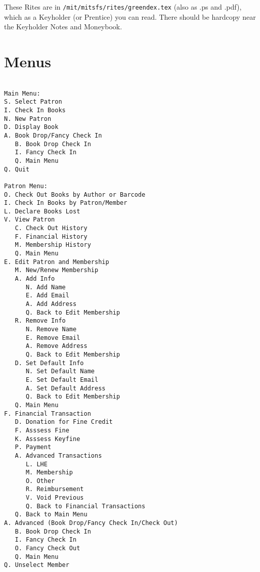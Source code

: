 \documentclass[12pt]{article}
\begin{document}
These Rites are in \verb$/mit/mitsfs/rites/greendex.tex$ (also as .ps
and .pdf), which as a Keyholder (or Prentice) you can read.  There
should be hardcopy near the Keyholder Notes and Moneybook.


\appendix
\section{Menus}
\begin{verbatim}

Main Menu:
S. Select Patron
I. Check In Books
N. New Patron
D. Display Book
A. Book Drop/Fancy Check In
   B. Book Drop Check In
   I. Fancy Check In
   Q. Main Menu
Q. Quit

Patron Menu:
O. Check Out Books by Author or Barcode
I. Check In Books by Patron/Member
L. Declare Books Lost
V. View Patron
   C. Check Out History
   F. Financial History
   M. Membership History
   Q. Main Menu
E. Edit Patron and Membership
   M. New/Renew Membership
   A. Add Info
      N. Add Name
      E. Add Email
      A. Add Address
      Q. Back to Edit Membership
   R. Remove Info
      N. Remove Name
      E. Remove Email
      A. Remove Address
      Q. Back to Edit Membership
   D. Set Default Info
      N. Set Default Name
      E. Set Default Email
      A. Set Default Address
      Q. Back to Edit Membership
   Q. Main Menu
F. Financial Transaction
   D. Donation for Fine Credit
   F. Asssess Fine
   K. Asssess Keyfine
   P. Payment
   A. Advanced Transactions
      L. LHE
      M. Membership
      O. Other
      R. Reimbursement
      V. Void Previous
      Q. Back to Financial Transactions
   Q. Back to Main Menu
A. Advanced (Book Drop/Fancy Check In/Check Out)
   B. Book Drop Check In
   I. Fancy Check In
   O. Fancy Check Out
   Q. Main Menu
Q. Unselect Member

\end{verbatim}
\end{document}
